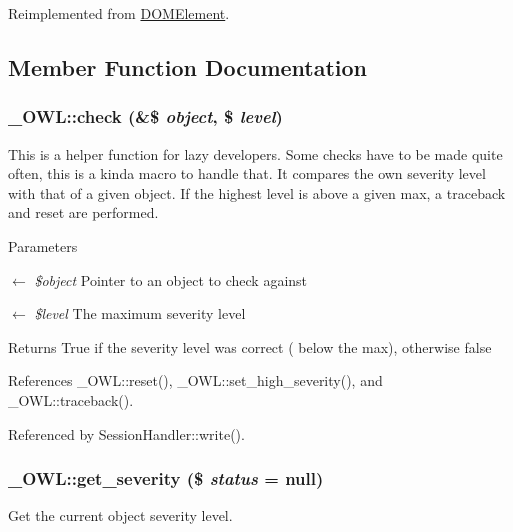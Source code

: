 Reimplemented from \hyperlink{classDOMElement_a309ad8e22a59ba874187929c4c851be3}{DOMElement}.



\subsection{Member Function Documentation}
\subsubsection[{check}]{\setlength{\rightskip}{0pt plus 5cm}\_\-OWL::check (\&\$ {\em object}, \/  \$ {\em level})}\label{class__OWL_ad6f4f6946f40199dd0333cf219fa500e}
This is a helper function for lazy developers. Some checks have to be made quite often, this is a kinda macro to handle that. It compares the own severity level with that of a given object. If the highest level is above a given max, a traceback and reset are performed.


\begin{DoxyParams}{Parameters}
\item[\mbox{$\leftarrow$} {\em \$object}]Pointer to an object to check against \item[\mbox{$\leftarrow$} {\em \$level}]The maximum severity level \end{DoxyParams}
\begin{DoxyReturn}{Returns}
True if the severity level was correct ( below the max), otherwise false 
\end{DoxyReturn}


References \_\-OWL::reset(), \_\-OWL::set\_\-high\_\-severity(), and \_\-OWL::traceback().



Referenced by SessionHandler::write().

\subsubsection[{get\_\-severity}]{\setlength{\rightskip}{0pt plus 5cm}\_\-OWL::get\_\-severity (\$ {\em status} = {\ttfamily null})}\label{class__OWL_adf9509ef96858be7bdd9414c5ef129aa}
Get the current object severity level.


